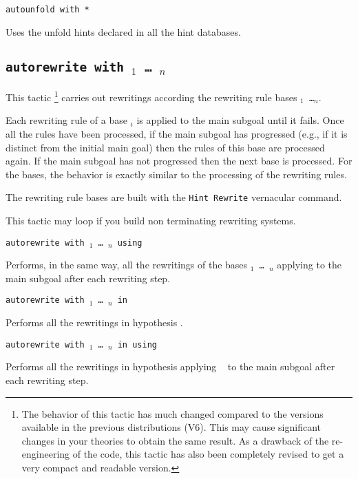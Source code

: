 \begin{coq_example*}
\begin{Variants}
\item {\tt autounfold with *}

  Uses the unfold hints declared in all the hint databases.
\end{Variants}


\subsection{\tt autorewrite with \ident$_1$ \mbox{\dots} \ident$_n$}
\label{tactic:autorewrite}

This tactic \footnote{The behavior of this tactic has much changed compared to
the versions available in the previous distributions (V6). This may cause
significant changes in your theories to obtain the same result. As a drawback
of the re-engineering of the code, this tactic has also been completely revised
to get a very compact and readable version.} carries out rewritings according
the rewriting rule bases {\tt \ident$_1$ \dots \ident$_n$}.

Each rewriting rule of a base \ident$_i$ is applied to the main subgoal until
it fails. Once all the rules have been processed, if the main subgoal has
progressed (e.g., if it is distinct from the initial main goal) then the rules
of this base are processed again. If the main subgoal has not progressed then
the next base is processed. For the bases, the behavior is exactly similar to
the processing of the rewriting rules.

The rewriting rule bases are built with the {\tt Hint~Rewrite} vernacular
command.

\Warning{} This tactic may loop if you build non terminating rewriting systems.

\begin{Variant}
\item {\tt autorewrite with \ident$_1$ \mbox{\dots} \ident$_n$ using \tac}

Performs, in the same way, all the rewritings of the bases {\tt \ident$_1$
\mbox{\dots} \ident$_n$} applying {\tt \tac} to the main subgoal after each
rewriting step.

\item {\tt autorewrite with \ident$_1$ \mbox{\dots} \ident$_n$ in \qualid}

  Performs all the rewritings in hypothesis {\qualid}.
\item {\tt autorewrite with \ident$_1$ \mbox{\dots} \ident$_n$ in {\qualid} using \tac}

  Performs all  the rewritings  in hypothesis {\qualid}  applying {\tt
    \tac} to the main subgoal after each rewriting step.


\end{Variant}
\end{coq_example*}
